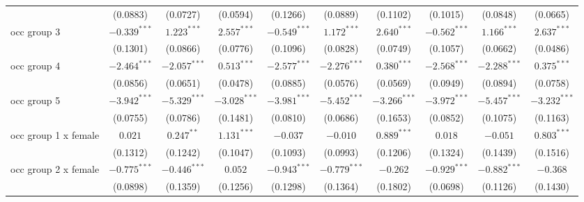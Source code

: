\begin{tabular}{l|ccc|ccc|ccc}
                           &                (0.0883) &        (0.0727) &        (0.0594) &                 (0.1266) &        (0.0889) &        (0.1102) &                 (0.1015) &        (0.0848) &        (0.0665) \\
occ group 3                &          $-0.339^{***}$ &   $1.223^{***}$ &   $2.557^{***}$ &           $-0.549^{***}$ &   $1.172^{***}$ &   $2.640^{***}$ &           $-0.562^{***}$ &   $1.166^{***}$ &   $2.637^{***}$ \\
                           &                (0.1301) &        (0.0866) &        (0.0776) &                 (0.1096) &        (0.0828) &        (0.0749) &                 (0.1057) &        (0.0662) &        (0.0486) \\
occ group 4                &          $-2.464^{***}$ &  $-2.057^{***}$ &   $0.513^{***}$ &           $-2.577^{***}$ &  $-2.276^{***}$ &   $0.380^{***}$ &           $-2.568^{***}$ &  $-2.288^{***}$ &   $0.375^{***}$ \\
                           &                (0.0856) &        (0.0651) &        (0.0478) &                 (0.0885) &        (0.0576) &        (0.0569) &                 (0.0949) &        (0.0894) &        (0.0758) \\
occ group 5                &          $-3.942^{***}$ &  $-5.329^{***}$ &  $-3.028^{***}$ &           $-3.981^{***}$ &  $-5.452^{***}$ &  $-3.266^{***}$ &           $-3.972^{***}$ &  $-5.457^{***}$ &  $-3.232^{***}$ \\
                           &                (0.0755) &        (0.0786) &        (0.1481) &                 (0.0810) &        (0.0686) &        (0.1653) &                 (0.0852) &        (0.1075) &        (0.1163) \\
occ group 1 x female       &                 $0.021$ &    $0.247^{**}$ &   $1.131^{***}$ &                 $-0.037$ &        $-0.010$ &   $0.889^{***}$ &                  $0.018$ &        $-0.051$ &   $0.803^{***}$ \\
                           &                (0.1312) &        (0.1242) &        (0.1047) &                 (0.1093) &        (0.0993) &        (0.1206) &                 (0.1324) &        (0.1439) &        (0.1516) \\
occ group 2 x female       &          $-0.775^{***}$ &  $-0.446^{***}$ &         $0.052$ &           $-0.943^{***}$ &  $-0.779^{***}$ &        $-0.262$ &           $-0.929^{***}$ &  $-0.882^{***}$ &        $-0.368$ \\
                           &                (0.0898) &        (0.1359) &        (0.1256) &                 (0.1298) &        (0.1364) &        (0.1802) &                 (0.0698) &        (0.1126) &        (0.1430) \\

\end{tabular}
